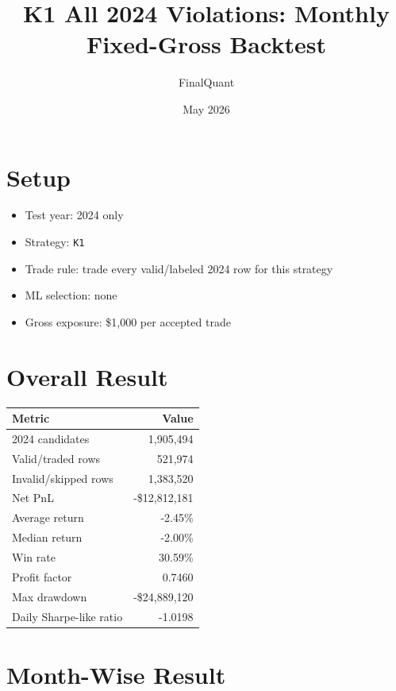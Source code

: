 \documentclass[11pt]{article}
\title{K1 All 2024 Violations: Monthly Fixed-Gross Backtest}
\author{FinalQuant}
\date{May 2026}
\begin{document}
\maketitle

\section{Setup}

\begin{itemize}
  \item Test year: 2024 only
  \item Strategy: \texttt{K1}
  \item Trade rule: trade every valid/labeled 2024 row for this strategy
  \item ML selection: none
  \item Gross exposure: \$1,000 per accepted trade
\end{itemize}

\section{Overall Result}

\begin{center}
\begin{tabular}{@{}lr@{}}
\toprule
Metric & Value \\
\midrule
2024 candidates & 1,905,494 \\
Valid/traded rows & 521,974 \\
Invalid/skipped rows & 1,383,520 \\
Net PnL & -\$12,812,181 \\
Average return & -2.45\% \\
Median return & -2.00\% \\
Win rate & 30.59\% \\
Profit factor & 0.7460 \\
Max drawdown & -\$24,889,120 \\
Daily Sharpe-like ratio & -1.0198 \\
\bottomrule
\end{tabular}
\end{center}

\section{Month-Wise Result}
\end{document}
